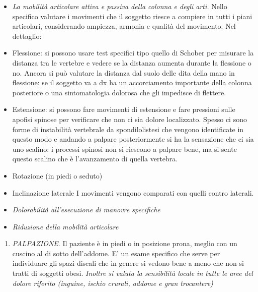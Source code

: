 \documentclass[]{article}
\begin{document}
\begin{itemize}
\item
  \emph{La mobilità articolare attiva e passiva della colonna e degli
  arti.} Nello specifico valutare i movimenti che il soggetto riesce a
  compiere in tutti i piani articolari, considerando ampiezza, armonia e
  qualità del movimento. Nel dettaglio:
\end{itemize}

\begin{itemize}
\item
  Flessione: si possono usare test specifici tipo quello di Schober per
  misurare la distanza tra le vertebre e vedere se la distanza aumenta
  durante la flessione o no. Ancora si può valutare la distanza dal
  suolo delle dita della mano in flessione: se il soggetto va a dx ha un
  accorciamento importante della colonna posteriore o una sintomatologia
  dolorosa che gli impedisce di flettere.
\item
  Estensione: si possono fare movimenti di estensione e fare pressioni
  sulle apofisi spinose per verificare che non ci sia dolore
  localizzato. Spesso ci sono forme di instabilità vertebrale da
  spondilolistesi che vengono identificate in questo modo e andando a
  palpare posteriormente si ha la sensazione che ci sia uno scalino: i
  processi spinosi non si riescono a palpare bene, ma si sente questo
  scalino che è l'avanzamento di quella vertebra.
\item
  Rotazione (in piedi o seduto)
\item
  Inclinazione laterale I movimenti vengono comparati con quelli contro
  laterali.
\end{itemize}

\begin{itemize}
\item
  \emph{Dolorabilità all'esecuzione di manovre specifiche}
\item
  \emph{Riduzione della mobilità articolare}
\end{itemize}

\begin{enumerate}
\def\labelenumi{\arabic{enumi}.}
\item
  \emph{PALPAZIONE}. Il paziente è in piedi o in posizione prona, meglio
  con un cuscino al di sotto dell'addome. E' un esame specifico che
  serve per individuare gli spazi discali che in genere si vedono bene a
  meno che non si tratti di soggetti obesi. \emph{Inoltre si valuta la
  sensibilità locale in tutte le aree del dolore riferito (inguine,
  ischio crurali, addome e gran trocantere)}
\end{enumerate}
\end{document}
